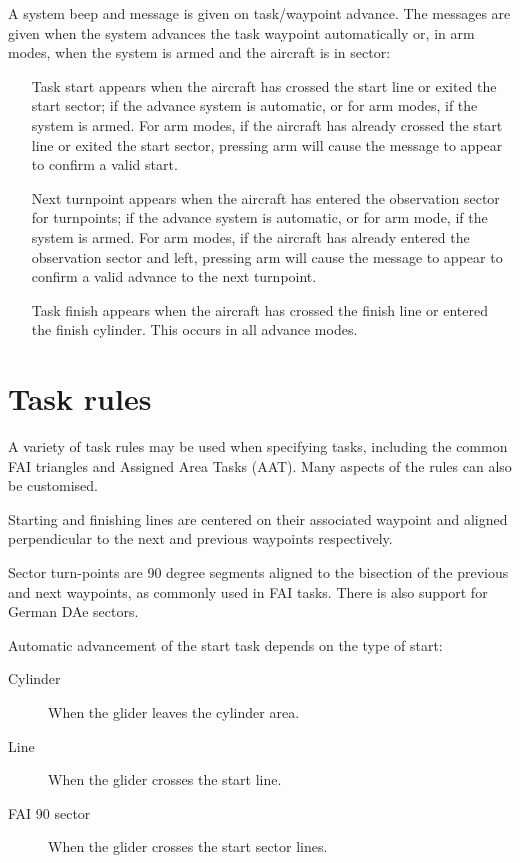 \documentclass[a4paper,12pt]{refrep}
\begin{document}
A system beep and message is given on task/waypoint advance.  The
messages are given when the system advances the task waypoint
automatically or, in arm modes, when the system is armed and the
aircraft is in sector:
\begin{itemize}
\item[Task start] appears when the aircraft has crossed the start line or
 exited the start sector; if the advance system is automatic, or for
 arm modes, if the system is armed.  For arm modes, if the aircraft
 has already crossed the start line or exited the start sector,
 pressing arm will cause the message to appear to confirm a valid
 start.
\item[Next turnpoint] appears when the aircraft has entered the observation
 sector for turnpoints; if the advance system is automatic, or for arm
 mode, if the system is armed.  For arm modes, if the aircraft has
 already entered the observation sector and left, pressing arm will
 cause the message to appear to confirm a valid advance to the next
 turnpoint.
\item[Task finish] appears when the aircraft has crossed the finish line
 or entered the finish cylinder.  This occurs in all advance modes. 
\end{itemize}

\section{Task rules}\label{sec:task-rules}

A variety of task rules may be used when specifying tasks, including
the common FAI triangles and Assigned Area Tasks (AAT).  Many aspects
of the rules can also be customised.

Starting and finishing lines are centered on their associated waypoint
and aligned perpendicular to the next and previous waypoints
respectively.

Sector turn-points are 90 degree segments aligned to the bisection of
the previous and next waypoints, as commonly used in FAI tasks.
There is also support for German DAe sectors.

Automatic advancement of the start task depends on the type of start:
\begin{description}
\item[Cylinder] When the glider leaves the cylinder area.
\item[Line] When the glider crosses the start line.
\item[FAI 90 sector] When the glider crosses the start sector lines.
\end{description}
\end{document}
